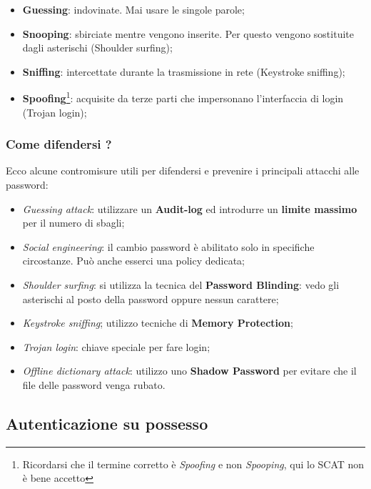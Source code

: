 \begin{itemize}
      \item \textbf{Guessing}: indovinate. Mai usare le singole parole;
      \item \textbf{Snooping}: sbirciate mentre vengono inserite.
            Per questo vengono sostituite dagli asterischi
            (Shoulder surfing);
      \item \textbf{Sniffing}: intercettate durante la trasmissione in rete
            (Keystroke sniffing);
      \item \textbf{Spoofing}\footnote{Ricordarsi che il termine corretto è
                  \textit{Spoofing} e non \textit{Spooping}, qui lo SCAT non è bene
                  accetto }: acquisite da terze parti che impersonano
            l'interfaccia di login (Trojan login);

\end{itemize}

\subsubsection{Come difendersi ?}

Ecco alcune contromisure utili per difendersi e prevenire i principali attacchi
alle password:

\begin{itemize}
      \item \textit{Guessing attack}:
            utilizzare un \textbf{Audit-log} ed introdurre un
            \textbf{limite massimo} per il numero di sbagli;
      \item \textit{Social engineering}: il cambio password è abilitato solo in
            specifiche circostanze.
            Può anche esserci una policy dedicata;
      \item \textit{Shoulder surfing}: si utilizza la tecnica del
            \textbf{Password Blinding}: vedo gli asterischi al posto della
            password oppure nessun carattere;
      \item \textit{Keystroke sniffing}; utilizzo tecniche di
            \textbf{Memory Protection};
      \item \textit{Trojan login}: chiave speciale per fare login;
      \item \textit{Offline dictionary attack}: utilizzo uno
            \textbf{Shadow Password} per evitare che
            il file delle password venga rubato.
\end{itemize}

\subsection{Autenticazione su possesso}

